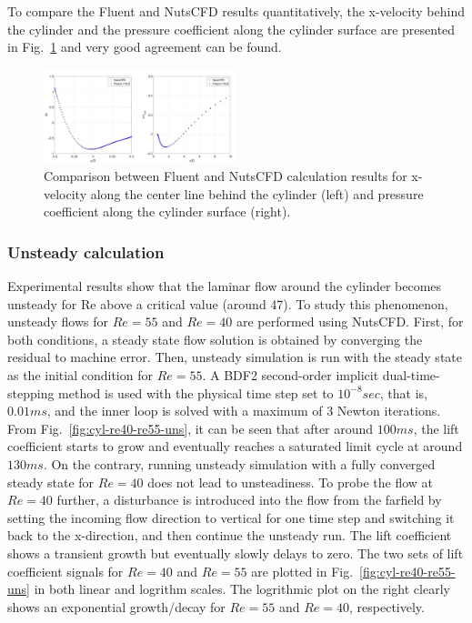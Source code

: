 \documentclass[journal,final]{new-aiaa}
\begin{document}
To compare the Fluent and NutsCFD results quantitatively, the x-velocity
behind the cylinder and the pressure coefficient along the cylinder
surface are presented in Fig.~\ref{fig:cyl-re55-u-cp} and very good agreement
can be found.
\begin{figure}[htb]
	\centering   
	\includegraphics[width=0.5\textwidth]{pic/cylinder-std-compare.png}
	\caption{Comparison between Fluent and NutsCFD calculation results for
		x-velocity along the center line behind the cylinder (left) and pressure
		coefficient along the cylinder surface (right).}
		\label{fig:cyl-re55-u-cp}
\end{figure}

\subsubsection{Unsteady calculation}
Experimental results show that the laminar flow around the cylinder
becomes unsteady for Re above a critical value (around 47). To study
this phenomenon, unsteady flows for $Re=55$ and $Re=40$
are performed using NutsCFD. First, for both conditions, a steady
state flow solution is obtained by converging the residual to machine error.
Then, unsteady simulation is run with the steady state
as the initial condition for $Re=55$.
A BDF2 second-order implicit dual-time-stepping
method is used with the physical time step set to
$10^{-8} sec$, that is, $0.01 ms$, and
the inner loop is solved with a maximum of 3 Newton iterations.
From Fig.~\ref{fig:cyl-re40-re55-uns}, it can be seen
that after around $100 ms$, the lift coefficient starts to grow and
eventually reaches a saturated limit cycle at around $130 ms$.
On the contrary, running unsteady simulation with a fully converged
steady state for $Re=40$ does not lead to unsteadiness. To probe
the flow at $Re=40$ further, a disturbance is introduced into the
flow from the farfield by setting the incoming flow direction to vertical
for one time step and switching it back to the x-direction,
and then continue the unsteady run. The lift coefficient shows a
transient growth but eventually slowly delays to zero. The
two sets of lift coefficient signals for $Re=40$ and $Re=55$
are plotted in Fig.~\ref{fig:cyl-re40-re55-uns}
in both linear and logrithm scales. The logrithmic plot on the right
clearly shows an exponential growth/decay for $Re=55$ and $Re=40$,
respectively.
\end{document}
